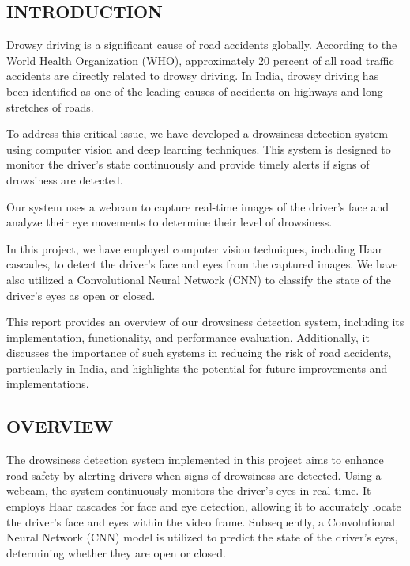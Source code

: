 \documentclass[12pt]{article}
\begin{document}
\renewcommand{\sectionmark}[1]{\markright{#1}}
\renewcommand{\subsectionmark}[1]{}


\begin{center}
\section{INTRODUCTION}
\end{center}
Drowsy driving is a significant cause of road accidents globally. According to the World Health Organization (WHO), approximately 20 percent of all road traffic accidents are directly related to drowsy driving. In India, drowsy driving has been identified as one of the leading causes of accidents on highways and long stretches of roads.

To address this critical issue, we have developed a drowsiness detection system using computer vision and deep learning techniques. This system is designed to monitor the driver's state continuously and provide timely alerts if signs of drowsiness are detected.

Our system uses a webcam to capture real-time images of the driver's face and analyze their eye movements to determine their level of drowsiness.

In this project, we have employed computer vision techniques, including Haar cascades, to detect the driver's face and eyes from the captured images. We have also utilized a Convolutional Neural Network (CNN) to classify the state of the driver's eyes as open or closed.

This report provides an overview of our drowsiness detection system, including its implementation, functionality, and performance evaluation. Additionally, it discusses the importance of such systems in reducing the risk of road accidents, particularly in India, and highlights the potential for future improvements and implementations.\\
\subsection{OVERVIEW}
The drowsiness detection system implemented in this project aims to enhance road safety by alerting drivers when signs of drowsiness are detected. Using a webcam, the system continuously monitors the driver's eyes in real-time. It employs Haar cascades for face and eye detection, allowing it to accurately locate the driver's face and eyes within the video frame. Subsequently, a Convolutional Neural Network (CNN) model is utilized to predict the state of the driver's eyes, determining whether they are open or closed.
\end{document}
